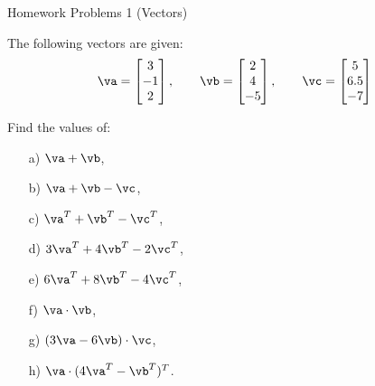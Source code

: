  \begin{center}\begin{large} Homework Problems 1 (Vectors) \end{large}\end{center}
 \bigskip


\begin{problem}%
    The following vectors are given:
\[
\va= \begin{bmatrix} 3 \\ -1 \\ 2 \end{bmatrix}, \qquad \vb=\begin{bmatrix} 2 \\ 4 \\ -5 \end{bmatrix}, \qquad \vc = \begin{bmatrix}
    5 \\ 6.5 \\ -7
\end{bmatrix}
\]

Find the values of:

    \begin{enumerate}
        \item[a) ] $\va+\vb$,
        
        \item[b) ] $\va+\vb-\vc$,

        \item[c) ] $\va^T+\vb^T-\vc^T$,

        \item[d) ] $3\va^T+4\vb^T-2\vc^T$,
        
        \item[e) ] $6\va^T+8\vb^T-4\vc^T$,
        
        \item[f) ] $\va \cdot \vb$,
        
            \item[g) ] $(3\va - 6\vb) \cdot \vc$,
            \item[h) ] $\va \cdot (4\va^T - \vb^T)^T$.
        \end{enumerate}
\end{problem}



     
    
